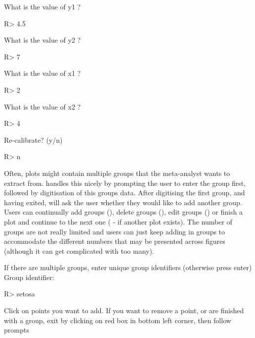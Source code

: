 \documentclass[article]{jss}
\newcommand{\fct}[1]{\code{#1()}}
\begin{document}
\begin{CodeChunk}
\begin{CodeOutput}
What is the value of y1 ?
\end{CodeOutput}
\begin{CodeInput}
R> 4.5
\end{CodeInput}
\begin{CodeOutput}
What is the value of y2 ?
\end{CodeOutput}
\begin{CodeInput}
R> 7
\end{CodeInput}
\begin{CodeOutput}
What is the value of x1 ?
\end{CodeOutput}
\begin{CodeInput}
R> 2
\end{CodeInput}
\begin{CodeOutput}
What is the value of x2 ?
\end{CodeOutput}
\begin{CodeInput}
R> 4
\end{CodeInput}
\begin{CodeOutput}
Re-calibrate? (y/n) 
\end{CodeOutput}
\begin{CodeInput}
R> n
\end{CodeInput}
\end{CodeChunk}

Often, plots might contain multiple groups that the meta-analyst wants to extract from. \fct{metaDigitise} handles this nicely by prompting the user to enter the group first, followed by digitisation of this groups data. After digitising the first group, and having exited, \fct{metaDigitise} will ask the user whether they would like to add another group. Users can continually add groups (), delete groups (), edit groups () or finish a plot and continue to the next one ( - if another plot exists). 
The number of groups are not really limited and users can just keep adding in groups to accommodate the different numbers that may be presented across figures (although it can get complicated with too many).

\begin{CodeChunk}
\begin{CodeOutput}
If there are multiple groups, enter unique group identifiers (otherwise press enter)
Group identifier: 
\end{CodeOutput}
\begin{CodeInput}
R> setosa
\end{CodeInput}
\begin{CodeOutput}
Click on points you want to add.
If you want to remove a point, or are finished with a group, 
exit by clicking on red box in bottom left corner, then follow prompts
\end{CodeOutput}
\end{CodeChunk}
\end{document}
